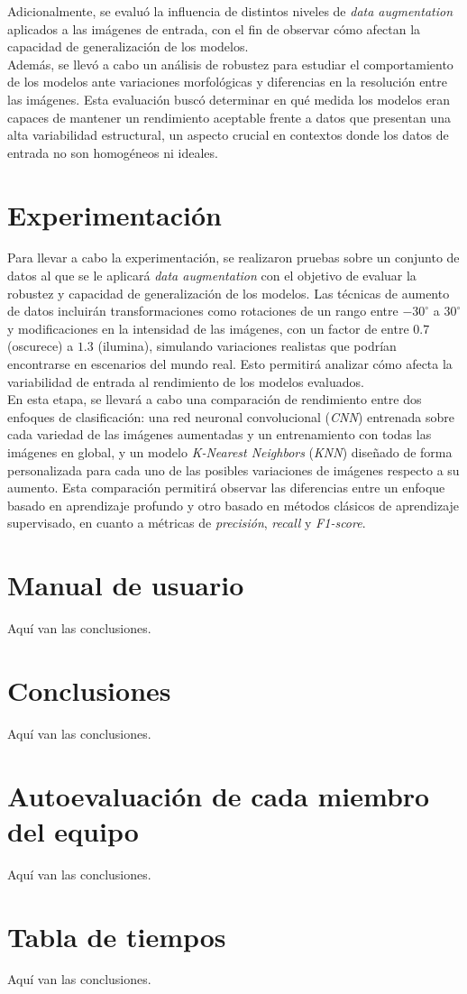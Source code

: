 \documentclass[12pt]{article} %
\begin{document}
Adicionalmente, se evaluó la influencia de distintos niveles de \textit{data augmentation} aplicados a las imágenes de entrada, con el fin de observar cómo afectan la capacidad de generalización de los modelos.\\

Además, se llevó a cabo un análisis de robustez para estudiar el comportamiento de los modelos ante variaciones morfológicas y diferencias en la resolución entre las imágenes. Esta evaluación buscó determinar en qué medida los modelos eran capaces de mantener un rendimiento aceptable frente a datos que presentan una alta variabilidad estructural, un aspecto crucial en contextos donde los datos de entrada no son homogéneos ni ideales.

\section{Experimentación}
Para llevar a cabo la experimentación, se realizaron pruebas sobre un conjunto de datos al que se le aplicará \textit{data augmentation} con el objetivo de evaluar la robustez y capacidad de generalización de los modelos. Las técnicas de aumento de datos incluirán transformaciones como rotaciones de un rango entre $-30^\circ$ a $30^\circ$ y modificaciones en la intensidad de las imágenes, con un factor de entre $0.7$ (oscurece) a $1.3$ (ilumina), simulando variaciones realistas que podrían encontrarse en escenarios del mundo real. Esto permitirá analizar cómo afecta la variabilidad de entrada al rendimiento de los modelos evaluados. \\

En esta etapa, se llevará a cabo una comparación de rendimiento entre dos enfoques de clasificación: una red neuronal convolucional (\textit{CNN}) entrenada sobre cada variedad de las imágenes aumentadas y un entrenamiento con todas las imágenes en global, y un modelo \textit{K-Nearest Neighbors} (\textit{KNN}) diseñado de forma personalizada para cada uno de las posibles variaciones de imágenes respecto a su aumento. Esta comparación permitirá observar las diferencias entre un enfoque basado en aprendizaje profundo y otro basado en métodos clásicos de aprendizaje supervisado, en cuanto a métricas de \textit{precisión}, \textit{recall} y \textit{F1-score}.



\section{Manual de usuario}
Aquí van las conclusiones.

\section{Conclusiones}
Aquí van las conclusiones.

\section{Autoevaluación de cada miembro del equipo}
Aquí van las conclusiones.

\section{Tabla de tiempos}
Aquí van las conclusiones.

\printbibliography
\end{document}
